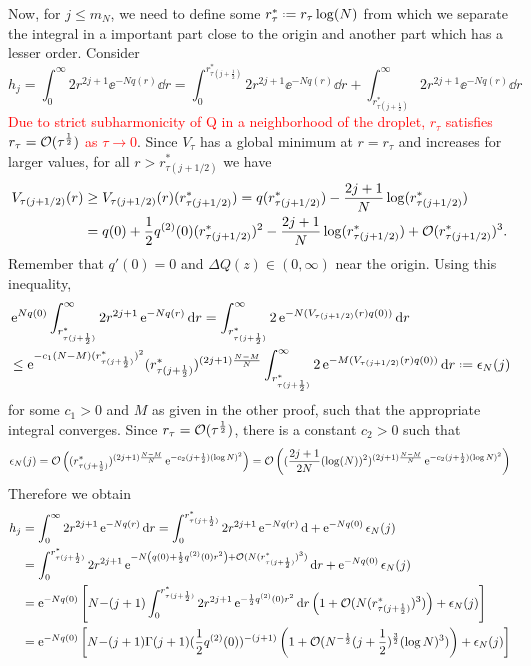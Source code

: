 Now, for $j \leq m_N$, we need to define some $r^*_\tau \deff r_\tau \log(N)$ from which we separate the integral in a important part close to the origin and another part which has a lesser order. Consider
\begin{equation}
	h_j = \int_{0}^{\infty} 2r^{2j+1} \ee^{-N q(r)} \dd r =\int_{0}^{r^*_{\tau(j+\frac{1}{2})}} 2r^{2j+1} \ee^{-N q(r)} \dd r + \int_{r^*_{\tau(j+\frac{1}{2})}}^{\infty} 2r^{2j+1} \ee^{-N q(r)} \dd r
\end{equation}
\textcolor{red}{Due to strict subharmonicity of Q in a neighborhood of the droplet, $r_\tau$ satisfies $r_\tau = \mathcal{O} (\tau^{\frac{1}{2}})$ as $\tau \rightarrow 0$}. Since $V_\tau$ has a global minimum at $r = r_\tau$ and increases for larger values, for all $r > r^*_{\tau(j + 1/2)}$ we have
\begin{align}
	V_{\tau(j+1/2)}(r) & \geq V_{\tau(j+1/2)}(r)(r^*_{\tau(j+1/2)}) = q(r^*_{\tau(j+1/2)}) - \frac{2j + 1}{N} \log(r^*_{\tau(j+1/2)}) \\
	& = q(0) + \frac{1}{2} q^{(2)}(0)(r^*_{\tau(j+1/2)})^2 - \frac{2j + 1}{N} \log(r^*_{\tau(j+1/2)}) + \mathcal{O}(r^*_{\tau(j+1/2)})^3.
\end{align}
Remember that $q'(0) = 0$ and $\Delta Q(z) \in (0, \infty)$ near the origin. Using this inequality,
\begin{align}
	& \ee^{N q(0)} \int_{r^*_{\tau(j+\frac{1}{2})}}^{\infty} 2r^{2j+1} \ee^{-N q(r)} \dd r = \int_{r^*_{\tau(j+\frac{1}{2})}}^{\infty} 2 \ee^{-N (V_{\tau(j+1/2)}(r) q(0))} \dd r \\
	& \leq \ee^{-c_1 (N-M) (r^*_{\tau(j+\frac{1}{2})})^2} (r^*_{\tau(j+\frac{1}{2})})^{(2j+1) \frac{N-M}{N}} \int_{r^*_{\tau(j+\frac{1}{2})}}^{\infty} 2 \ee^{-M (V_{\tau(j+1/2)}(r) q(0))} \dd r \deff \epsilon_N(j)
\end{align}
for some $c_1 > 0$ and $M$ as given in the other proof, such that the appropriate integral converges. Since $r_\tau = \mathcal{O}(\tau^{\frac{1}{2}})$, there is a constant $c_2 > 0$ such that
\begin{equation}
	\epsilon_N(j) = \mathcal{O}\left( (r^*_{\tau(j+\frac{1}{2})})^{(2j+1) \frac{N-M}{N}} \operatorname{e}^{-c_2 (j + \frac{1}{2}) (\log N)^2} \right) = \mathcal{O}\left( (\frac{2j+1}{2N} (\log(N))^2)^{(2j+1) \frac{N-M}{N}} \operatorname{e}^{-c_2 (j + \frac{1}{2}) (\log N)^2} \right)
\end{equation}
Therefore we obtain
\begin{align}
	h_j & = \int_{0}^{\infty} 2r^{2j+1} \operatorname{e}^{-N q(r)} \mathrm{d} r = \int_{0}^{r^*_{\tau(j+\frac{1}{2})}} 2r^{2j+1} \operatorname{e}^{-N q(r)} \mathrm{d} + \operatorname{e}^{-N q(0)} \epsilon_N(j) \\
	& = \int_{0}^{r^*_{\tau(j+\frac{1}{2})}} 2r^{2j+1} \operatorname{e}^{-N \left( q(0) + \frac{1}{2} q^{(2)}(0) r^2 \right) + \mathcal{O}(N(r^*_{\tau(j+\frac{1}{2})})^3)} \mathrm{d}  r + \operatorname{e}^{-N q(0)} \epsilon_N(j) \\
	& =  \operatorname{e}^{-N q(0)} \left[ N{-(j+1)} \int_{0}^{r^*_{\tau(j+\frac{1}{2})}} 2r^{2j+1} \operatorname{e}^{-\frac{1}{2} q^{(2)}(0) r^2} \mathrm{d} r \left( 1 + \mathcal{O}(N(r^*_{\tau(j+\frac{1}{2})})^3) \right)+ \epsilon_N(j) \right] \\
	&=  \operatorname{e}^{-N q(0)} \left[ N{-(j+1)} \Gamma(j+1)(\frac{1}{2} q^{(2)}(0))^{-(j+1)} \left( 1 + \mathcal{O}(N^{-\frac{1}{2}} (j+\frac{1}{2})^{\frac{3}{2}} (\log N)^3) \right)+ \epsilon_N(j) \right]
\end{align}
